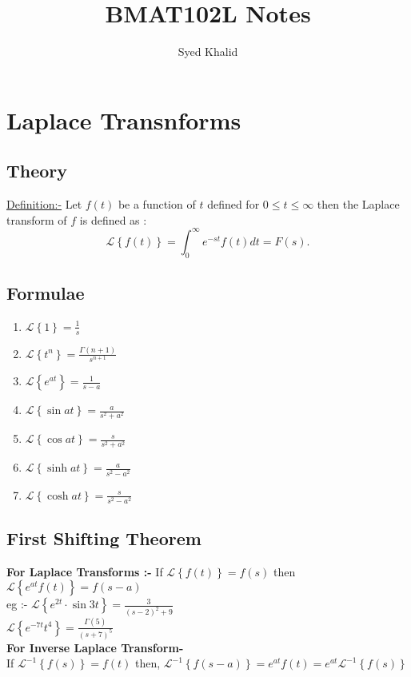 \documentclass{article}
\title{\textbf{BMAT102L Notes}}
\author{Syed Khalid}
\begin{document}
\maketitle

\section{Laplace Transnforms}%
  \label{sec:Laplace Transnforms}
\subsection{Theory}%
  \label{sub:Theory}
  \underline{Definition:-} Let $f(t)$ be a function of $t$ defined
  for $0\le t\le \infty$ then the Laplace transform of $f$ is defined as :
  \[
    \mathcal{L} \left \{f(t) \right \} = \int_0^\infty e^{-st}f(t)dt = F(s) 
  .\] 
  \subsection{Formulae}
 \begin{enumerate}
   \item $ \mathcal{L} \left \{1 \right \} = \frac{1}{s}$
   \item    $ \mathcal{L} \left \{t^n \right \} = \frac{\Gamma (n+1) }{s^{n+1}}$
   \item $ \mathcal{L} \left \{ e^{at} \right \} = \frac{1}{s-a} $
   \item $ \mathcal{L} \left \{\sin at \right \} = \frac{a}{s^2+a^2} $
   \item $ \mathcal{L} \left \{\cos at \right \} = \frac{s}{s^2+a^2} $
   \item $ \mathcal{L} \left \{\sinh at \right \} = \frac{a}{s^2-a^2} $
   \item $ \mathcal{L} \left \{\cosh at \right \}= \frac{s}{s^2-a^2} $
\end{enumerate}
 \subsection{First Shifting Theorem}%
   \label{sub:First Shifting Theorem}
   \textbf{   For Laplace Transforms :-
}
   If $\mathcal{L} \left \{f(t) \right \} = f(s)$ then $ \mathcal{L} \left \{e^{at}f(t) \right \} = f(s-a) $ \\

   eg :- $ \mathcal{L} \left \{e^{2t}\cdot \sin 3t  \right \} = \frac{3}{(s-2)^2+9} $ \\
   $ \mathcal{L} \left \{e^{-7t}t^4 \right \} = \frac{\Gamma (5) }{(s+7)^5}$ \\
   \textbf{   For Inverse Laplace Transform-\\
}
If   $\mathcal{L}^{-1} \left \{ f(s) \right \} = f(t) $ then, $\mathcal{L}^{-1} \left \{f(s-a) \right \}= e^{at} f(t) = e^{at} \mathcal{L}^{-1} \left \{f(s) \right \}    $ \\
\end{document}
